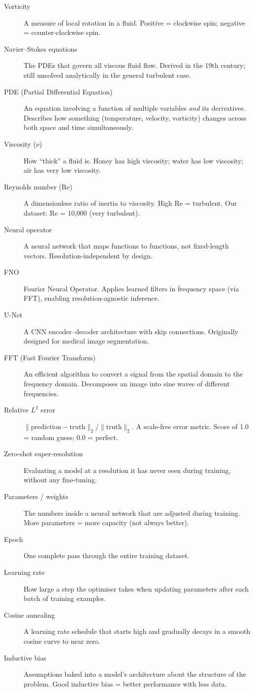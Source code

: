 \documentclass[11pt,twocolumn]{article}
\begin{document}
\begin{description}
  \item[Vorticity] A measure of local rotation in a fluid.
        Positive = clockwise spin; negative = counter-clockwise spin.
  \item[Navier--Stokes equations] The PDEs that govern all viscous fluid flow.
        Derived in the 19th century; still unsolved analytically in the general
        turbulent case.
  \item[PDE (Partial Differential Equation)] An equation involving a function
        of multiple variables \emph{and} its derivatives.
        Describes how something (temperature, velocity, vorticity) changes
        across both space and time simultaneously.
  \item[Viscosity ($\nu$)] How ``thick'' a fluid is. Honey has high viscosity;
        water has low viscosity; air has very low viscosity.
  \item[Reynolds number (Re)] A dimensionless ratio of inertia to viscosity.
        High Re = turbulent. Our dataset: Re = 10{,}000 (very turbulent).
  \item[Neural operator] A neural network that maps functions to functions,
        not fixed-length vectors. Resolution-independent by design.
  \item[FNO] Fourier Neural Operator. Applies learned filters in frequency
        space (via FFT), enabling resolution-agnostic inference.
  \item[U-Net] A CNN encoder--decoder architecture with skip connections.
        Originally designed for medical image segmentation.
  \item[FFT (Fast Fourier Transform)] An efficient algorithm to convert a
        signal from the spatial domain to the frequency domain.
        Decomposes an image into sine waves of different frequencies.
  \item[Relative $L^2$ error] $\|\text{prediction} - \text{truth}\|_2 /
        \|\text{truth}\|_2$. A scale-free error metric. Score of 1.0 = random
        guess; 0.0 = perfect.
  \item[Zero-shot super-resolution] Evaluating a model at a resolution it has
        never seen during training, without any fine-tuning.
  \item[Parameters / weights] The numbers inside a neural network that are
        adjusted during training. More parameters = more capacity (not always
        better).
  \item[Epoch] One complete pass through the entire training dataset.
  \item[Learning rate] How large a step the optimiser takes when updating
        parameters after each batch of training examples.
  \item[Cosine annealing] A learning rate schedule that starts high and
        gradually decays in a smooth cosine curve to near zero.
  \item[Inductive bias] Assumptions baked into a model's architecture about
        the structure of the problem. Good inductive bias = better performance
        with less data.
\end{description}
\end{document}
